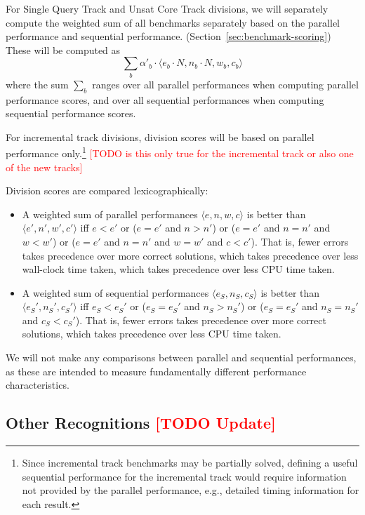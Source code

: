 \documentclass[12pt]{article}
\newcommand{\rem}[1]{\textcolor{red}{[#1]}}
\newcommand{\todo}[1]{\rem{TODO #1}}
\newcommand{\maintrack}{Single Query Track\xspace}
\newcommand{\ucoretrack}{Unsat Core Track\xspace}
\begin{document}
For \maintrack and \ucoretrack divisions, we will separately
compute the weighted sum of all benchmarks separately based on the
parallel performance and sequential performance.
(Section~\ref{sec:benchmark-scoring})
%
These will be computed as
$$\sum_b \alpha'_b \cdot \langle e_b \cdot N, n_b \cdot N, w_b, c_b\rangle$$
%
where the sum $\sum_b$ ranges over all parallel performances when
computing parallel performance scores, and over all sequential
performances when computing sequential performance scores.
\iffalse
benchmarks in the division to assess parallel performance, and the
weighted sum of all sequential performances (Section~\ref{sec:sequential})
to assess sequential performance.
\fi
For incremental track divisions,
division scores will be based on parallel performance only.\footnote{Since
  incremental track benchmarks may be partially solved, defining a
  useful sequential performance for the incremental track would require
  information not provided by the parallel performance, e.g., detailed timing
  information for each result.}
  \todo{is this only true for the incremental track or also one of the new tracks}

Division scores are compared lexicographically:
\begin{itemize}
\item A weighted sum of parallel performances $\langle e, n, w, c\rangle$ is
  better than $\langle e', n', w', c'\rangle$ iff $e < e'$ or ($e =
  e'$ and $n > n'$) or ($e = e'$ and $n = n'$ and $w < w'$) or ($e =
  e'$ and $n = n'$ and $w = w'$ and $c < c'$).  That is, fewer errors
  takes precedence over more correct solutions, which takes precedence
  over less wall-clock time taken, which takes precedence over less
  CPU time taken.
\item A weighted sum of sequential performances $\langle e_S, n_S,
  c_S\rangle$ is better than $\langle e_S', n_S', c_S'\rangle$ iff
  $e_S < e_S'$ or ($e_S = e_S'$ and $n_S > n_S'$) or ($e_S = e_S'$ and
  $n_S = n_S'$ and $c_S < c_S'$).  That is, fewer errors takes
  precedence over more correct solutions, which takes precedence over
  less CPU time taken.
\end{itemize}
%
We will not make any comparisons between parallel and sequential
performances, as these are intended to measure fundamentally different
performance characteristics.

\subsection{Other Recognitions \todo{Update}}
\end{document}
